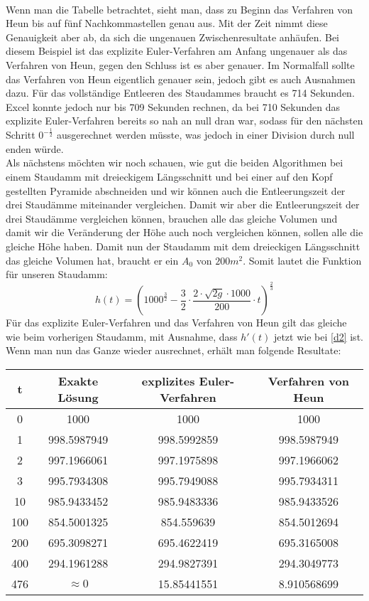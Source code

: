 \documentclass[a4paper,12pt]{report}
\begin{document}
\noindent
\\Wenn man die Tabelle betrachtet, sieht man, dass zu Beginn das Verfahren von Heun bis auf fünf Nachkommastellen genau aus. Mit der Zeit nimmt diese Genauigkeit aber ab, da sich die ungenauen Zwischenresultate anhäufen. Bei diesem Beispiel ist das explizite Euler-Verfahren am Anfang ungenauer als das Verfahren von Heun, gegen den Schluss ist es aber genauer. Im Normalfall sollte das Verfahren von Heun eigentlich genauer sein, jedoch gibt es auch Ausnahmen dazu. Für das vollständige Entleeren des Staudammes braucht es 714 Sekunden. Excel konnte jedoch nur bis 709 Sekunden rechnen, da bei 710 Sekunden das explizite Euler-Verfahren bereits so nah an null dran war, sodass für den nächsten Schritt $0^{-\frac{1}{2}}$ ausgerechnet werden müsste, was jedoch in einer Division durch null enden würde. \\

\noindent
Als nächstens möchten wir noch schauen, wie gut die beiden Algorithmen bei einem Staudamm mit dreieckigem Längsschnitt und bei einer auf den Kopf gestellten Pyramide abschneiden und wir können auch die Entleerungszeit der drei Staudämme miteinander vergleichen. Damit wir aber die Entleerungszeit der drei Staudämme vergleichen können, brauchen alle das gleiche Volumen und damit wir die Veränderung der Höhe auch noch vergleichen können, sollen alle die gleiche Höhe haben. Damit nun der Staudamm mit dem dreieckigen Längsschnitt das gleiche Volumen hat, braucht er ein $A_0$ von $200m^2$. Somit lautet die Funktion für unseren Staudamm:
\begin{equation}
h(t) = \left( 1000^{\frac{3}{2}}- \frac{3}{2} \cdot \frac{2 \cdot  \sqrt{2g} \cdot 1000}{200} \cdot t \right)^{\frac{2}{3}}
\end{equation} 
Für das explizite Euler-Verfahren und das Verfahren von Heun gilt das gleiche wie beim vorherigen Staudamm, mit Ausnahme, dass $h'(t)$ jetzt wie bei \ref{d2} ist. Wenn man nun das Ganze wieder ausrechnet, erhält man folgende Resultate: \\

\begin{center}
\begin{tabular}[h]{c|c|c|c}
t & Exakte Lösung & explizites Euler-Verfahren & Verfahren von Heun \\
\hline
0 & 1000 & 1000 & 1000 \\
\hline
1 &998.5987949 & 998.5992859 & 998.5987949 \\
\hline
2 & 997.1966061 & 997.1975898 & 997.1966062 \\
\hline
3 & 995.7934308 & 995.7949088 & 995.7934311 \\
\hline
10 & 985.9433452 & 985.9483336 & 985.9433526 \\
\hline
100 & 854.5001325 & 854.559639 & 854.5012694 \\
\hline
200 & 695.3098271 & 695.4622419 & 695.3165008 \\
\hline
400 & 294.1961288 & 294.9827391 & 294.3049773 \\
\hline
476 & $\approx 0$ & 15.85441551 & 8.910568699 \\

\end{tabular}
\end{center}
\end{document}
